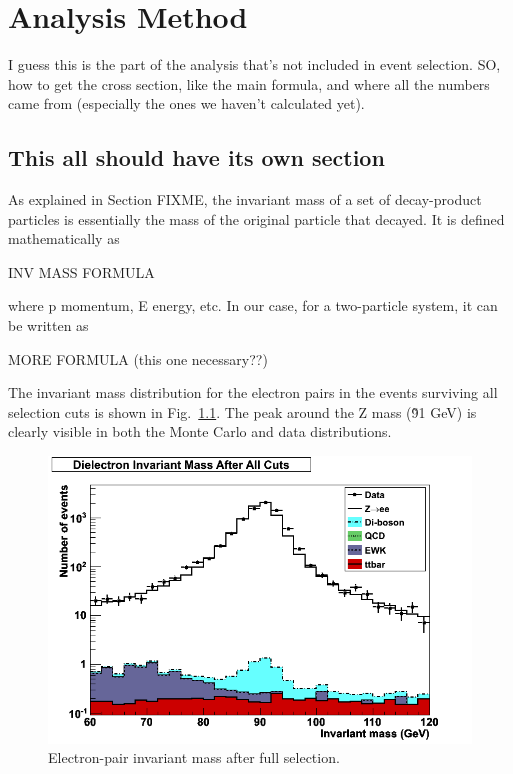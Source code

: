 \newcommand{\nevents}{8453}

\chapter{Analysis Method}
\label{anMeth}
I guess this is the part of the analysis that's not included in event selection.  
SO, how to get the cross section, like the main formula, 
and where all the numbers came from (especially the ones we haven't calculated yet).


\section{This all should have its own section}

As explained in Section FIXME, 
the invariant mass of a set of decay-product particles is 
essentially the mass of the original particle that decayed. 
It is defined mathematically as 

INV MASS FORMULA

where p momentum, E energy, etc. 
In our case, for a two-particle system, it can be written as 

MORE FORMULA (this one necessary??)

The invariant mass distribution for the electron pairs 
in the events surviving all selection cuts is shown in 
Fig.~\ref{fig:InvMass}.  
The peak around the Z mass (\~91 GeV) is clearly visible 
in both the Monte Carlo and data distributions.  



 \begin{figure}[htb]
  \begin{center}
    \includegraphics[width=360pt]{Figures/invMass-04Apr11.png}
  \end{center}
  \caption[Electron-pair invariant mass after full selection]{Electron-pair invariant mass after full selection.}
  \label{fig:InvMass}
 \end{figure}

